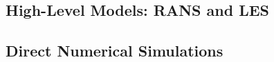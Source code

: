 \subsection{High-Level Models: \acs{RANS} and \acs{LES}} %
\label{sub:high_level_models}
%

%
%
\subsection{Direct Numerical Simulations} %
\label{sub:direct_numerical_simulations}
%

%
%
%
